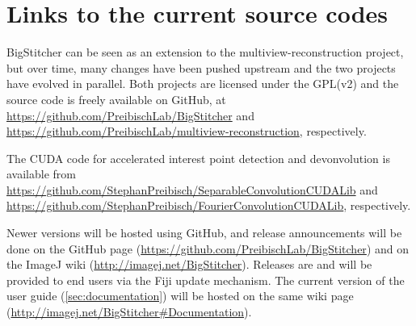 
\section{Links to the current source codes}
\label{sec:currentcode}

BigStitcher can be seen as an extension to the multiview-reconstruction project, but over time, many changes have been pushed upstream and the two projects have evolved in parallel. Both projects are licensed under the GPL(v2) and the source code is freely available on GitHub, at \url{https://github.com/PreibischLab/BigStitcher} and \url{https://github.com/PreibischLab/multiview-reconstruction}, respectively.

The CUDA code for accelerated interest point detection and devonvolution is available from \url{https://github.com/StephanPreibisch/SeparableConvolutionCUDALib} and \url{https://github.com/StephanPreibisch/FourierConvolutionCUDALib}, respectively.

Newer versions will be hosted using GitHub, and release announcements will be done on the GitHub page (\url{https://github.com/PreibischLab/BigStitcher}) and on the ImageJ wiki (\url{http://imagej.net/BigStitcher}). Releases are and will be provided to end users via the Fiji update mechanism. The current version of the user guide (\ref{sec:documentation}) will be hosted on the same wiki page (\url{http://imagej.net/BigStitcher#Documentation}).